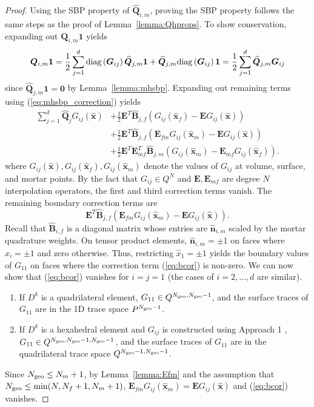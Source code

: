 \documentclass{svjour3}                     %
\renewcommand{\hat}{\widehat}
\newcommand{\diag}[1]{{\rm diag}\LRp{#1}}
\newcommand{\LRp}[1]{\left( #1 \right)}
\begin{document}
\begin{proof}
Using the SBP property of $\hat{\bm{Q}}_{i,m}$, proving the SBP property follows the same steps as the proof of Lemma~\ref{lemma:Qhprops}.  To show conservation, expanding out $\bm{Q}_{i,m}\bm{1} $ yields
\[
\bm{Q}_{i,m}\bm{1} = \frac{1}{2}\sum_{j=1}^d \diag{\bm{G}_{ij}}\hat{\bm{Q}}_{j,m}\bm{1} + \hat{\bm{Q}}_{j,m} \diag{\bm{G}_{ij}}\bm{1} = \frac{1}{2}\sum_{j=1}^d\hat{\bm{Q}}_{j,m} \bm{G}_{ij}
\]
since $\hat{\bm{Q}}_{j,m}\bm{1} = \bm{0}$ by Lemma~\ref{lemma:mhsbp}.  Expanding out remaining terms using (\ref{eq:mhsbp_correction}) yields
\begin{align*}
\sum_{j=1}^d \hat{\bm{Q}}_j G_{ij}(\hat{\bm{x}}) &+ \frac{1}{2} \bm{E}^T\hat{\bm{B}}_{j,f}\LRp{G_{ij}(\hat{\bm{x}}_f) - \bm{E}G_{ij}(\hat{\bm{x}})} \\
&+ \frac{1}{2} \bm{E}^T\hat{\bm{B}}_{j,f}\LRp{\bm{E}_{fm}G_{ij}(\hat{\bm{x}}_m) - \bm{E}G_{ij}(\hat{\bm{x}})} \\
&+ \frac{1}{2} \bm{E}^T\bm{E}_{mf}^T\hat{\bm{B}}_{j,m}\LRp{G_{ij}(\hat{\bm{x}}_m) - \bm{E}_{mf}G_{ij}(\hat{\bm{x}}_f)}.
\end{align*}
where $G_{ij}(\hat{\bm{x}}), G_{ij}(\hat{\bm{x}}_f), G_{ij}(\hat{\bm{x}}_m)$ denote the values of $G_{ij}$ at volume, surface, and mortar points.  By the fact that $G_{ij} \in Q^N$ and $\bm{E}, \bm{E}_{mf}$ are degree $N$ interpolation operators, the first and third correction terms vanish.  The remaining boundary correction terms are
\begin{equation}
\bm{E}^T\hat{\bm{B}}_{j,f}\LRp{\bm{E}_{fm}G_{ij}(\hat{\bm{x}}_m) - \bm{E}G_{ij}(\hat{\bm{x}})}.  
\label{eq:bcor}
\end{equation}
Recall that $\hat{\bm{B}}_{i,f}$ is a diagonal matrix whose entries are $\hat{\bm{n}}_{i,m}$ scaled by the mortar quadrature weights.  On tensor product elements, $\hat{\bm{n}}_{i,m}=\pm 1$ on faces where $\hat{x}_i = \pm 1$ and zero otherwise.  Thus, restricting $\hat{x}_1 = \pm 1$ yields the boundary values of $G_{11}$ on faces where the correction term (\ref{eq:bcor}) is non-zero.  We can now show that (\ref{eq:bcor}) vanishes for $i = j = 1$ (the cases of $i = 2,\ldots,d$ are similar).  
\begin{enumerate}
\item If $D^k$ is a quadrilateral element, $G_{11} \in Q^{N_{\rm geo},N_{\rm geo}-1}$, and the surface traces of $G_{11}$ are in the 1D trace space $P^{N_{\rm geo}-1}$.  
\item If $D^k$ is a hexahedral element and $G_{ij}$ is constructed using Approach 1 \cite{kozdon2018energy}, $G_{11} \in Q^{N_{\rm geo}, N_{\rm geo}-1,N_{\rm geo}-1}$, and the surface traces of $G_{11}$ are in the quadrilateral trace space $Q^{N_{\rm geo}-1,N_{\rm geo}-1}$.  
\end{enumerate}
Since $N_{\rm geo} \leq N_m+1$, by Lemma~\ref{lemma:Efm} and the assumption that $N_{\rm geo} \leq \min(N, N_f+1, N_m+1)$, $\bm{E}_{fm}G_{ij}(\hat{\bm{x}}_m) = \bm{E}G_{ij}(\hat{\bm{x}})$ and (\ref{eq:bcor}) vanishes.  


\end{proof}
\end{document}
